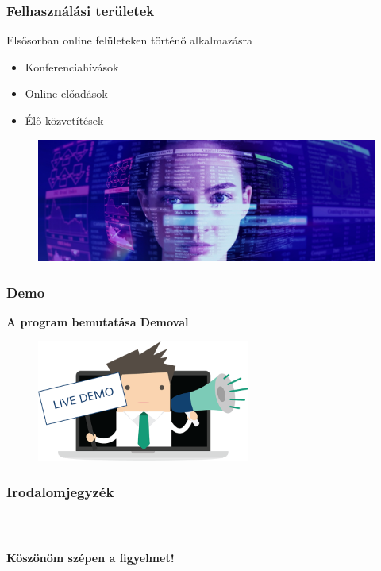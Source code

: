 \documentclass{beamer}
\begin{document}
\begin{frame}[fragile]
\frametitle{Felhasználási területek}

Elsősorban online felületeken történő alkalmazásra

\begin{itemize}
	\item Konferenciahívások
	\item Online előadások
	\item Élő közvetítések
\end{itemize}

\begin{figure}[htb]
	\includegraphics[width=\textwidth]{images/virtual.png}
\end{figure}

\end{frame}

\begin{frame}[fragile]
\frametitle{Demo}

\begin{center}
	\Large
	\textbf{A program bemutatása Demoval}
\end{center}

\begin{figure}[htb]
	\includegraphics[width=7cm]{images/demo.png}
\end{figure}

\end{frame}

\begin{frame}[fragile]
\frametitle{Irodalomjegyzék}




\end{frame}

\begin{frame}[fragile]
\frametitle{\ }

\begin{center}
	\Large
	\textbf{Köszönöm szépen a figyelmet!}
\end{center}

\end{frame}

\end{document}
